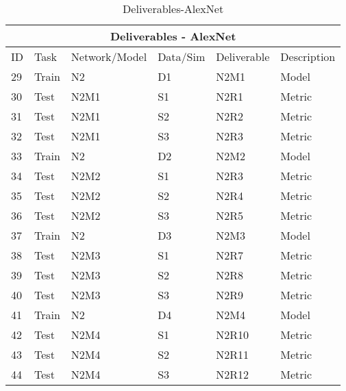 \documentclass{article}
\begin{document}
\begin{table}[]
\begin{center}
\begin{tabular}{|l|l|l|l|l|l|}
\hline
\multicolumn{6}{|c|}{Deliverables - AlexNet} \\ \hline

ID & Task &  Network/Model & Data/Sim & Deliverable & Description \\ \hline\hline
29 & Train & N2 & D1 & N2M1 & Model \\ \hline
30 & Test & N2M1 & S1 & N2R1 & Metric \\ \hline
31 & Test & N2M1 & S2 & N2R2 & Metric \\ \hline
32 & Test & N2M1 & S3 & N2R3 & Metric \\ \hline\hline

33 & Train & N2 & D2 & N2M2 & Model \\ \hline
34 & Test & N2M2 & S1 & N2R3 & Metric \\ \hline
35 & Test & N2M2 & S2 & N2R4 & Metric \\ \hline
36 & Test & N2M2 & S3 & N2R5 & Metric \\ \hline\hline

37 & Train & N2 & D3 & N2M3 & Model \\ \hline
38 & Test & N2M3 & S1 & N2R7 & Metric \\ \hline
39 & Test & N2M3 & S2 & N2R8 & Metric \\ \hline
40 & Test & N2M3 & S3 & N2R9 & Metric \\ \hline\hline

41 & Train & N2 & D4 & N2M4 & Model \\ \hline
42 & Test & N2M4 & S1 & N2R10 & Metric \\ \hline
43 & Test & N2M4 & S2 & N2R11 & Metric \\ \hline
44 & Test & N2M4 & S3 & N2R12 & Metric \\ \hline 

\end{tabular}
\end{center}
\caption{Deliverables-AlexNet}
\label{Deliverables-AlexNet}
\end{table}


\end{document}
